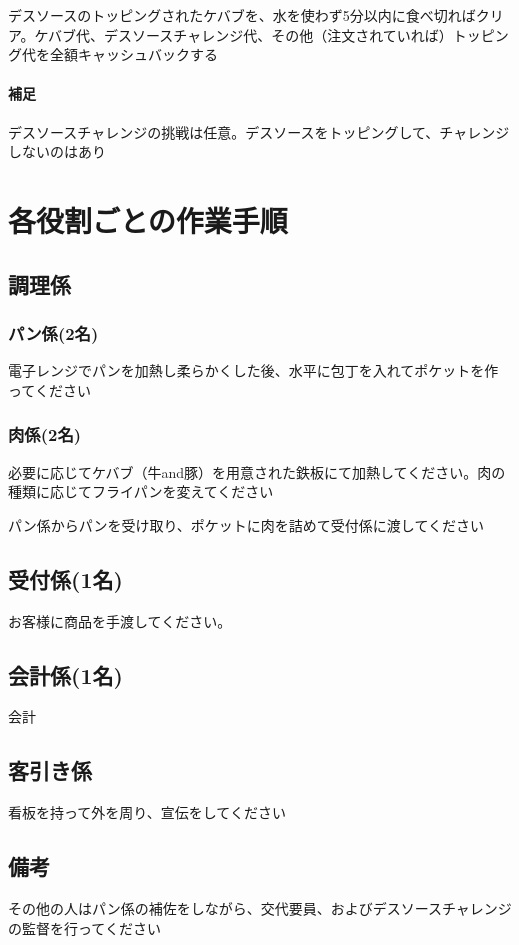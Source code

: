\documentclass[10pt,a4paper]{jarticle}
\begin{document}
デスソースのトッピングされたケバブを、水を使わず5分以内に食べ切ればクリア。ケバブ代、デスソースチャレンジ代、その他（注文されていれば）トッピング代を全額キャッシュバックする

\paragraph{補足}
デスソースチャレンジの挑戦は任意。デスソースをトッピングして、チャレンジしないのはあり


\section{各役割ごとの作業手順}
\subsection{調理係}
\subsubsection{パン係(2名)}
電子レンジでパンを加熱し柔らかくした後、水平に包丁を入れてポケットを作ってください
\subsubsection{肉係(2名)}
必要に応じてケバブ（牛and豚）を用意された鉄板にて加熱してください。肉の種類に応じてフライパンを変えてください

パン係からパンを受け取り、ポケットに肉を詰めて受付係に渡してください

\subsection{受付係(1名)}
お客様に商品を手渡してください。

\subsection{会計係(1名)}
会計

\subsection{客引き係}
看板を持って外を周り、宣伝をしてください

\subsection{備考}
その他の人はパン係の補佐をしながら、交代要員、およびデスソースチャレンジの監督を行ってください
\end{document}
